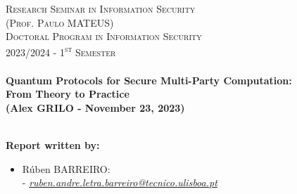 \documentclass[12pt]{article}
\begin{document}
\begin{titlepage}
\begin{figure}[H]
\begin{minipage}{.5\textwidth}
        \end{minipage}
    \end{figure}
    \vspace{-1cm}
    \textsc{\Large Research Seminar in Information Security}\\[0.5cm] %
    \textsc{(Prof. Paulo \uppercase{Mateus})}\\[0.5cm]
    \textsc{Doctoral Program in Information Security}\\[0.5cm] %
    \textsc{\large 2023/2024 - 1\textsuperscript{st} Semester}\\[0.5cm] %
    
    
    \HRule \\[0.3cm]
        { \huge \bfseries Quantum Protocols for Secure Multi-Party Computation:\\ \Large From Theory to Practice \\ \vspace{0.5cm} \Large (Alex \textsc{\uppercase{Grilo}} - November 23, 2023)}\\[0.4cm] %
    \HRule \\[1cm]
     
    
    \begin{minipage}{0.75\textwidth}
    
        \begin{flushleft} \large
            \textbf{Report written by:}\\
            \begin{itemize}
                \vspace{-0.1cm}
                \item \normalsize{Rúben \textsc{\uppercase{Barreiro}}:\\
                - \href{mailto:ruben.andre.letra.barreiro@tecnico.ulisboa.pt}{\emph{ruben.andre.letra.barreiro@tecnico.ulisboa.pt}}}
            \end{itemize}
        \end{flushleft}
    

\end{minipage}
\end{titlepage}
\end{document}
